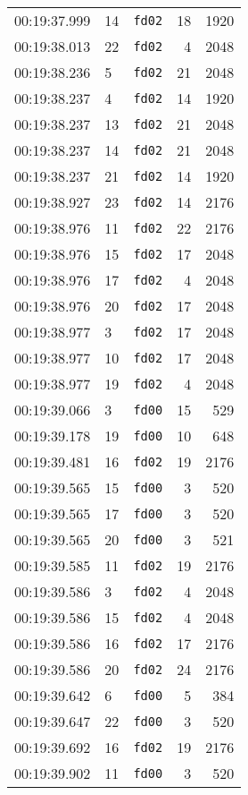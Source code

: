 \documentclass{article}
\begin{document}
\begin{longtable}{lllrr}
00:19:37.999 & 14 & \texttt{fd02} & 18 & 1920 \\
00:19:38.013 & 22 & \texttt{fd02} & 4 & 2048 \\
00:19:38.236 & 5 & \texttt{fd02} & 21 & 2048 \\
00:19:38.237 & 4 & \texttt{fd02} & 14 & 1920 \\
00:19:38.237 & 13 & \texttt{fd02} & 21 & 2048 \\
00:19:38.237 & 14 & \texttt{fd02} & 21 & 2048 \\
00:19:38.237 & 21 & \texttt{fd02} & 14 & 1920 \\
00:19:38.927 & 23 & \texttt{fd02} & 14 & 2176 \\
00:19:38.976 & 11 & \texttt{fd02} & 22 & 2176 \\
00:19:38.976 & 15 & \texttt{fd02} & 17 & 2048 \\
00:19:38.976 & 17 & \texttt{fd02} & 4 & 2048 \\
00:19:38.976 & 20 & \texttt{fd02} & 17 & 2048 \\
00:19:38.977 & 3 & \texttt{fd02} & 17 & 2048 \\
00:19:38.977 & 10 & \texttt{fd02} & 17 & 2048 \\
00:19:38.977 & 19 & \texttt{fd02} & 4 & 2048 \\
00:19:39.066 & 3 & \texttt{fd00} & 15 & 529 \\
00:19:39.178 & 19 & \texttt{fd00} & 10 & 648 \\
00:19:39.481 & 16 & \texttt{fd02} & 19 & 2176 \\
00:19:39.565 & 15 & \texttt{fd00} & 3 & 520 \\
00:19:39.565 & 17 & \texttt{fd00} & 3 & 520 \\
00:19:39.565 & 20 & \texttt{fd00} & 3 & 521 \\
00:19:39.585 & 11 & \texttt{fd02} & 19 & 2176 \\
00:19:39.586 & 3 & \texttt{fd02} & 4 & 2048 \\
00:19:39.586 & 15 & \texttt{fd02} & 4 & 2048 \\
00:19:39.586 & 16 & \texttt{fd02} & 17 & 2176 \\
00:19:39.586 & 20 & \texttt{fd02} & 24 & 2176 \\
00:19:39.642 & 6 & \texttt{fd00} & 5 & 384 \\
00:19:39.647 & 22 & \texttt{fd00} & 3 & 520 \\
00:19:39.692 & 16 & \texttt{fd02} & 19 & 2176 \\
00:19:39.902 & 11 & \texttt{fd00} & 3 & 520 \\

\end{longtable}
\end{document}

